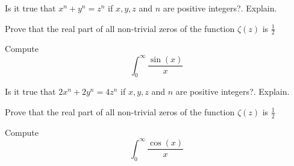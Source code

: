 \documentclass{exam}
\begin{document}
	
	\begin{center}
	\end{center}
	
	\vspace{5mm}
	
	\vspace{5mm}
	
	\begin{questions}
		\question Is it true that \(x^n + y^n = z^n\) if \(x,y,z\) and \(n\) are
		positive integers?. Explain.
		
		\question Prove that the real part of all non-trivial zeros of the function
		\(\zeta(z)\) is \(\frac{1}{2}\)
		
		\question Compute \[\int_{0}^{\infty} \frac{\sin(x)}{x}\]
	\end{questions}
	
	\begin{questions}
		
		\question Is it true that \(2x^n + 2y^n = 4z^n\) if \(x,y,z\) and \(n\) are positive integers?. Explain.
		\vspace{\stretch{1}}
		
		\question Prove that the real part of all non-trivial zeros of the function \(\zeta(z)\) is \(\frac{1}{2}\)
		\vspace{\stretch{1}}
		
		\question Compute \[\int_{0}^{\infty} \frac{\cos(x)}{x}\]
		\vspace{\stretch{1}}
		
	\end{questions}
	\clearpage
\end{document}
